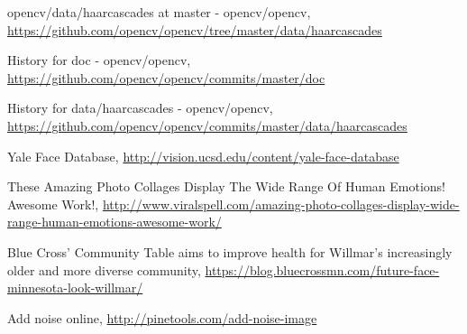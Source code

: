 \documentclass[10pt,twocolumn,letterpaper]{article}
\begin{document}
\begin{thebibliography}{99}
opencv/data/haarcascades at master - opencv/opencv,
\url{https://github.com/opencv/opencv/tree/master/data/haarcascades}

History for doc - opencv/opencv,
\url{https://github.com/opencv/opencv/commits/master/doc}

History for data/haarcascades - opencv/opencv,
\url{https://github.com/opencv/opencv/commits/master/data/haarcascades}

Yale Face Database,
\url{http://vision.ucsd.edu/content/yale-face-database}

These Amazing Photo Collages Display The Wide Range Of Human Emotions! Awesome Work!,
\url{http://www.viralspell.com/amazing-photo-collages-display-wide-range-human-emotions-awesome-work/}

Blue Cross' Community Table aims to improve health for Willmar's increasingly older and more diverse community,
\url{https://blog.bluecrossmn.com/future-face-minnesota-look-willmar/}

Add noise online,
\url{http://pinetools.com/add-noise-image}

\end{thebibliography}
\end{document}
